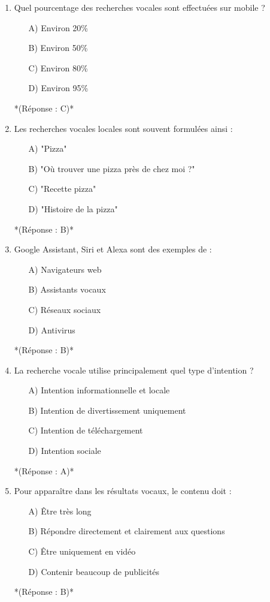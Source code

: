 \documentclass[12pt,a4paper,twoside]{report}
\begin{document}
\begin{enumerate}
    \item Quel pourcentage des recherches vocales sont effectuées sur mobile ?
    \begin{itemize}
        \item[A)] Environ 20\%
        \item[B)] Environ 50\%
        \item[C)] Environ 80\%
        \item[D)] Environ 95\%
    \end{itemize}
    *(Réponse : C)*

    \item Les recherches vocales locales sont souvent formulées ainsi :
    \begin{itemize}
        \item[A)] "Pizza"
        \item[B)] "Où trouver une pizza près de chez moi ?"
        \item[C)] "Recette pizza"
        \item[D)] "Histoire de la pizza"
    \end{itemize}
    *(Réponse : B)*

    \item Google Assistant, Siri et Alexa sont des exemples de :
    \begin{itemize}
        \item[A)] Navigateurs web
        \item[B)] Assistants vocaux
        \item[C)] Réseaux sociaux
        \item[D)] Antivirus
    \end{itemize}
    *(Réponse : B)*

    \item La recherche vocale utilise principalement quel type d'intention ?
    \begin{itemize}
        \item[A)] Intention informationnelle et locale
        \item[B)] Intention de divertissement uniquement
        \item[C)] Intention de téléchargement
        \item[D)] Intention sociale
    \end{itemize}
    *(Réponse : A)*

    \item Pour apparaître dans les résultats vocaux, le contenu doit :
    \begin{itemize}
        \item[A)] Être très long
        \item[B)] Répondre directement et clairement aux questions
        \item[C)] Être uniquement en vidéo
        \item[D)] Contenir beaucoup de publicités
    \end{itemize}
    *(Réponse : B)*


\end{enumerate}
\end{document}
